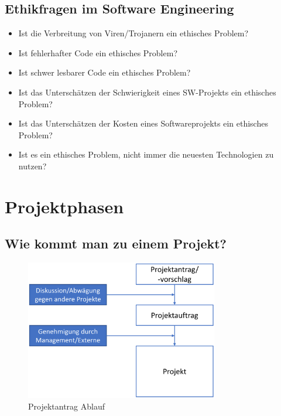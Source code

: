 \documentclass[11pt, a4paper]{article}
\begin{document}
\subsection{Ethikfragen im Software Engineering}

\begin{itemize}
    \item Ist die Verbreitung von Viren/Trojanern ein ethisches Problem?
    \item Ist fehlerhafter Code ein ethisches Problem?
    \item Ist schwer lesbarer Code ein ethisches Problem?
    \item Ist das Unterschätzen der Schwierigkeit eines SW-Projekts ein ethisches Problem?
    \item Ist das Unterschätzen der Kosten eines Softwareprojekts ein ethisches Problem?
    \item Ist es ein ethisches Problem, nicht immer die neuesten Technologien zu nutzen?
\end{itemize}

\newpage

\section{Projektphasen} %

\subsection{Wie kommt man zu einem Projekt?}

\begin{figure}[h]
    \centering
    \includegraphics[width=0.75\textwidth]{Projektphasen-00}
    \caption{Projektantrag Ablauf}
    \label{fig:Projektphasen-00}
\end{figure}
\end{document}

